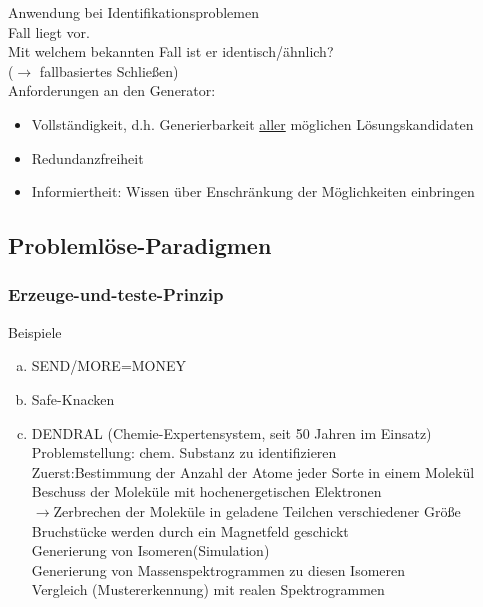 \documentclass[a4paper,14pt]{article}
\begin{document}

Anwendung bei Identifikationsproblemen\\
Fall liegt vor.\\
Mit welchem bekannten Fall ist er identisch/ähnlich?\\
($\rightarrow$ fallbasiertes Schließen)\\
Anforderungen an den Generator:
\begin{itemize}
 \item Vollständigkeit, d.h. Generierbarkeit \underline{aller} möglichen Lösungskandidaten
 \item Redundanzfreiheit
 \item Informiertheit: Wissen über Enschränkung der Möglichkeiten einbringen
\end{itemize}

\subsection{Problemlöse-Paradigmen}
\subsubsection{Erzeuge-und-teste-Prinzip}
Beispiele
\begin{enumerate}[(a)]
 \item SEND/MORE=MONEY
 \item Safe-Knacken
 \item DENDRAL (Chemie-Expertensystem, seit 50 Jahren im Einsatz)\\
 Problemstellung: chem. Substanz zu identifizieren\\
 Zuerst:Bestimmung der Anzahl der Atome jeder Sorte in einem Molekül\\
 Beschuss der Moleküle mit hochenergetischen Elektronen\\
 $\rightarrow$Zerbrechen der Moleküle in geladene Teilchen verschiedener Größe\\
 Bruchstücke werden durch ein Magnetfeld geschickt\\
 Generierung von Isomeren(Simulation)\\
 Generierung von Massenspektrogrammen zu diesen Isomeren\\
 Vergleich (Mustererkennung) mit realen Spektrogrammen\\
\end{enumerate}
\end{document}
